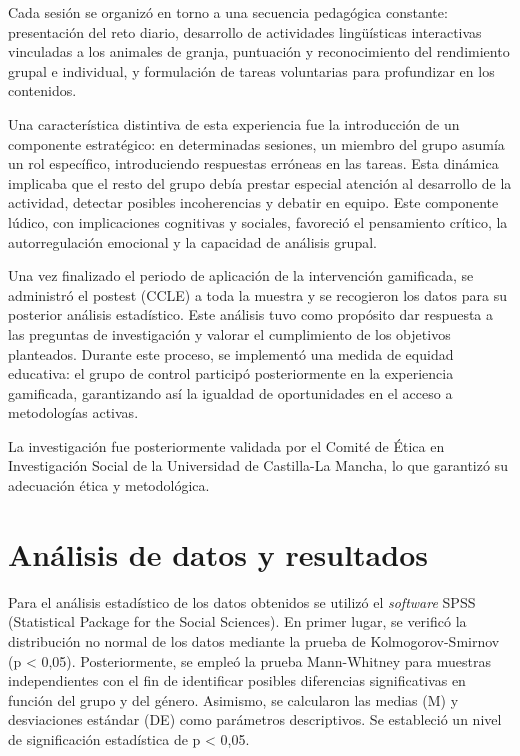 \documentclass[spanish]{textolivre}
\begin{document}
Cada sesión se organizó en torno a una secuencia pedagógica constante: presentación del reto diario, desarrollo de actividades lingüísticas interactivas vinculadas a los animales de granja, puntuación y reconocimiento del rendimiento grupal e individual, y formulación de tareas voluntarias para profundizar en los contenidos.

Una característica distintiva de esta experiencia fue la introducción de un componente estratégico: en determinadas sesiones, un miembro del grupo asumía un rol específico, introduciendo respuestas erróneas en las tareas. Esta dinámica implicaba que el resto del grupo debía prestar especial atención al desarrollo de la actividad, detectar posibles incoherencias y debatir en equipo. Este componente lúdico, con implicaciones cognitivas y sociales, favoreció el pensamiento crítico, la autorregulación emocional y la capacidad de análisis grupal.

Una vez finalizado el periodo de aplicación de la intervención gamificada, se administró el postest (CCLE) a toda la muestra y se recogieron los datos para su posterior análisis estadístico. Este análisis tuvo como propósito dar respuesta a las preguntas de investigación y valorar el cumplimiento de los objetivos planteados. Durante este proceso, se implementó una medida de equidad educativa: el grupo de control participó posteriormente en la experiencia gamificada, garantizando así la igualdad de oportunidades en el acceso a metodologías activas.

La investigación fue posteriormente validada por el Comité de Ética en Investigación Social de la Universidad de Castilla-La Mancha, lo que garantizó su adecuación ética y metodológica.

\section{Análisis de datos y resultados}
Para el análisis estadístico de los datos obtenidos se utilizó el \textit{software} SPSS (Statistical Package for the Social Sciences). En primer lugar, se verificó la distribución no normal de los datos mediante la prueba de Kolmogorov-Smirnov (p < 0,05). Posteriormente, se empleó la prueba Mann-Whitney para muestras independientes con el fin de identificar posibles diferencias significativas en función del grupo y del género. Asimismo, se calcularon las medias (M) y desviaciones estándar (DE) como parámetros descriptivos. Se estableció un nivel de significación estadística de p < 0,05.
\end{document}
